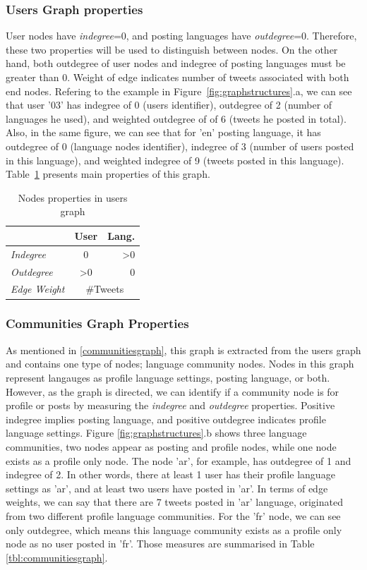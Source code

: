 \documentclass{llncs}
\begin{document}
\subsubsection{Users Graph properties}
User nodes have \emph{indegree}=0, and posting languages have 
\emph{outdegree}=0. Therefore, these two properties will be used to distinguish 
between nodes. On the other hand, both outdegree of user nodes and indegree of 
posting languages must be greater than 0. 
Weight of edge indicates number of tweets associated with both end nodes. 
Refering to the example in Figure~\ref{fig:graphstructures}.a, we can see that 
user '03' has indegree of 0 (users identifier), outdegree of 2 (number of languages 
he used), and weighted outdegree of of 6 (tweets he posted in total). Also, in the same figure,
we can see that for 'en' posting language, it has outdegree of 0 (language nodes 
identifier), indegree of 3 (number of users posted in this language), and weighted 
indegree of 9 (tweets posted in this language). Table~\ref{tbl:usersgraph} presents 
main properties of this graph.
\begin{table}[!htb]
\centering
\begin{tabular}{@{}lcr@{}}
\toprule
\textbf{}& \textbf{User} & \textbf{Lang.} \\ \midrule
{\emph{Indegree}} & 0 & \textgreater0 \\
{\emph{Outdegree}} & \textgreater0 & 0 \\ 
{\emph{Edge Weight}}& \multicolumn{2}{c}{\#Tweets}\\ \bottomrule
\end{tabular}
\caption{Nodes properties in users graph}
\label{tbl:usersgraph}
\end{table}

\subsubsection{Communities Graph Properties}
As mentioned in \ref{communitiesgraph}, this graph is extracted from the users
graph and contains one type of nodes; language community nodes. Nodes in 
this graph represent langauges as profile language settings, posting language, or both. 
However, as the graph is directed, we can identify if a community node is for profile or 
posts by measuring the \emph{indegree} and \emph{outdegree} properties. 
Positive indegree implies posting language, and positive outdegree indicates profile 
language settings. Figure \ref{fig:graphstructures}.b shows three language 
communities, two nodes appear as posting and profile nodes, while one node exists 
as a profile only node. The node 'ar', for example, has outdegree of 1 and indegree of 2. 
In other words, there at least 1 user has their profile language settings as 'ar', and at 
least two users have posted in 'ar'. In terms of edge weights, we can say that there are
7 tweets posted in 'ar' language, originated from two different profile language communities.
For the 'fr' node, we can see only outdegree, which means this language 
community exists as a profile only node as no user posted in 'fr'.
Those measures are summarised in Table \ref{tbl:communitiesgraph}.
\end{document}

